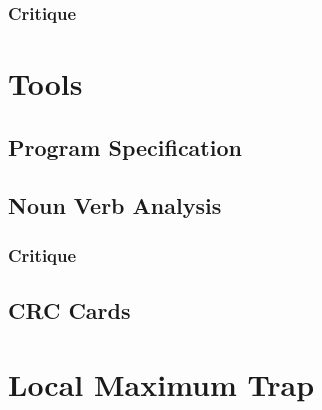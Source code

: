 \subsubsection{Critique}

\section{Tools}
\subsection{Program Specification}
\subsection{Noun Verb Analysis}
\subsubsection{Critique}


\subsection{CRC Cards}

\section{Local Maximum Trap}


